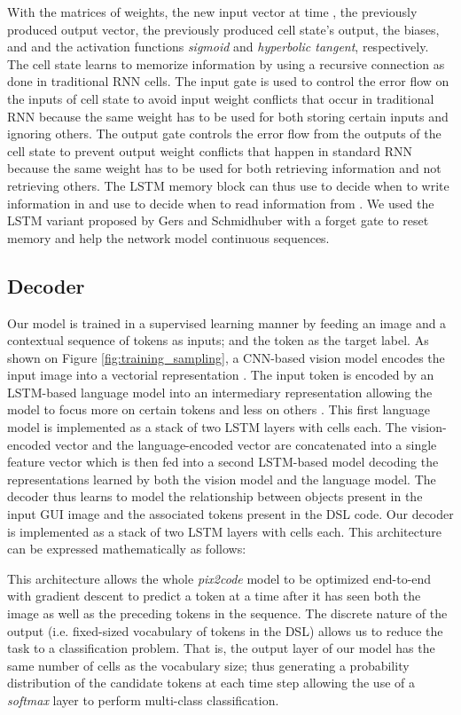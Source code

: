 \documentclass{article}
\begin{document}
With  the matrices of weights,  the new input vector at time ,  the previously produced output vector,  the previously produced cell state's output,  the biases, and  and  the activation functions \emph{sigmoid} and \emph{hyperbolic tangent}, respectively. The cell state  learns to memorize information by using a recursive connection as done in traditional RNN cells. The input gate  is used to control the error flow on the inputs of cell state  to avoid input weight conflicts that occur in traditional RNN because the same weight has to be used for both storing certain inputs and ignoring others. The output gate  controls the error flow from the outputs of the cell state  to prevent output weight conflicts that happen in standard RNN because the same weight has to be used for both retrieving information and not retrieving others. The LSTM memory block can thus use  to decide when to write information in  and use  to decide when to read information from . We used the LSTM variant proposed by Gers and Schmidhuber \cite{gers2000learning} with a forget gate  to reset memory and help the network model continuous sequences.

\subsection{Decoder}

Our model is trained in a supervised learning manner by feeding an image  and a contextual sequence  of  tokens  as inputs; and the token  as the target label.
As shown on Figure \ref{fig:training_sampling}, a CNN-based vision model encodes the input image  into a vectorial representation . The input token  is encoded by an LSTM-based language model into an intermediary representation  allowing the model to focus more on certain tokens and less on others \cite{graves2013generating}. This first language model is implemented as a stack of two LSTM layers with  cells each.
The vision-encoded vector  and the language-encoded vector  are concatenated into a single feature vector  which is then fed into a second LSTM-based model decoding the representations learned by both the vision model and the language model. The decoder thus learns to model the relationship between objects present in the input GUI image and the associated tokens present in the DSL code. Our decoder is implemented as a stack of two LSTM layers with  cells each. This architecture can be expressed mathematically as follows:



This architecture allows the whole \emph{pix2code} model to be optimized end-to-end with gradient descent to predict a token at a time after it has seen both the image as well as the preceding tokens in the sequence.
The discrete nature of the output (i.e. fixed-sized vocabulary of tokens in the DSL) allows us to reduce the task to a classification problem. That is, the output layer of our model has the same number of cells as the vocabulary size; thus generating a probability distribution of the candidate tokens at each time step allowing the use of a \emph{softmax} layer to perform multi-class classification.
\end{document}
